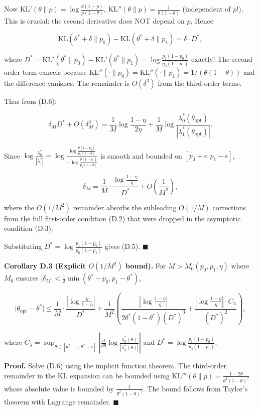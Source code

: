 \documentclass[
  12pt,
]{article}
\begin{document}
Now \(\text{KL}'(\theta\|p) = \log\frac{\theta(1-p)}{p(1-\theta)}\),
\(\text{KL}''(\theta\|p) = \frac{1}{\theta(1-\theta)}\) (independent of
\(p\)!). This is crucial: the second derivative does NOT depend on
\(p\). Hence

\[
\text{KL}(\theta^*+\delta\|p_0) - \text{KL}(\theta^*+\delta\|p_1)
= \delta \cdot D^*,
\]

where
\(D^* = \text{KL}'(\theta^*\|p_0) - \text{KL}'(\theta^*\|p_1) = \log\frac{p_1(1-p_0)}{p_0(1-p_1)}\)
exactly! The second-order term cancels because
\(\text{KL}''(\cdot\|p_0) = \text{KL}''(\cdot\|p_1) = 1/(\theta(1-\theta))\)
and the difference vanishes. The remainder is \(O(\delta^3)\) from the
third-order terms.

Thus from (D.6):

\[
\delta_M D^* + O(\delta_M^3) = \frac{1}{M}\log\frac{1-\eta}{2\eta} + \frac{1}{M}\log\frac{\lambda_0^*(\theta_{\text{opt}})}{|\lambda_1^*(\theta_{\text{opt}})|}.
\]

Since
\(\log\frac{\lambda_0^*}{|\lambda_1^*|} = \log\frac{\log\frac{\theta(1-p_0)}{p_0(1-\theta)}}{-\log\frac{\theta(1-p_1)}{p_1(1-\theta)}}\)
is smooth and bounded on \([p_0+\epsilon, p_1-\epsilon]\),

\[
\delta_M = \frac{1}{M}\cdot\frac{\log\frac{1-\eta}{\eta}}{D^*} + O\!\left(\frac{1}{M^2}\right),
\]

where the \(O(1/M^2)\) remainder absorbs the subleading \(O(1/M)\)
corrections from the full first-order condition (D.2) that were dropped
in the asymptotic condition (D.3).

Substituting \(D^* = \log\frac{p_1(1-p_0)}{p_0(1-p_1)}\) gives (D.5).
\(\blacksquare\)

\textbf{Corollary D.3 (Explicit \(O(1/M^2)\) bound).} For
\(M > M_0(p_0,p_1,\eta)\) where \(M_0\) ensures
\(|\delta_M| < \frac{1}{2}\min(\theta^*-p_0, p_1-\theta^*)\),

\[
\bigl|\theta_{\text{opt}} - \theta^*\bigr|
\leq \frac{1}{M}\cdot\frac{|\log\frac{\eta}{1-\eta}|}{D^*}
+ \frac{1}{M^2}\left(
\frac{|\log\frac{1-\eta}{\eta}|}{2\theta^*(1-\theta^*)(D^*)^3}
+ \frac{|\log\frac{1-\eta}{\eta}|\cdot C_{\lambda}}{(D^*)^2}
\right),
\]

where
\(C_\lambda = \sup_{\theta\in[\theta^*-\epsilon,\theta^*+\epsilon]} \left|\frac{d}{d\theta}\log\frac{\lambda_0^*(\theta)}{|\lambda_1^*(\theta)|}\right|\)
and \(D^* = \log\frac{p_1(1-p_0)}{p_0(1-p_1)}\).

\textbf{Proof.} Solve (D.6) using the implicit function theorem. The
third-order remainder in the KL expansion can be bounded using
\(\text{KL}'''(\theta\|p) = \frac{1-2\theta}{\theta^2(1-\theta)^2}\)
whose absolute value is bounded by \(\frac{1}{\theta^2(1-\theta)^2}\).
The bound follows from Taylor's theorem with Lagrange remainder.
\(\blacksquare\)
\end{document}
